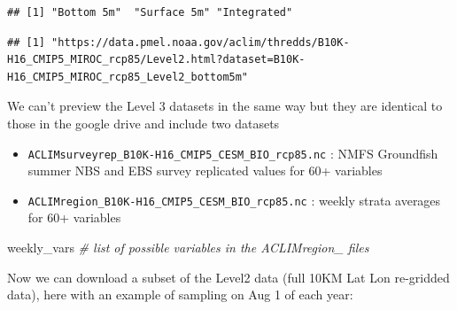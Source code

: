 \documentclass[
]{article}
\newenvironment{Shaded}{\begin{snugshade}}{\end{snugshade}}
\newcommand{\CommentTok}[1]{\textcolor[rgb]{0.56,0.35,0.01}{\textit{#1}}}
\newcommand{\NormalTok}[1]{#1}
\newcommand{\OtherTok}[1]{\textcolor[rgb]{0.56,0.35,0.01}{#1}}
\newcommand{\SpecialCharTok}[1]{\textcolor[rgb]{0.00,0.00,0.00}{#1}}
\newcommand{\StringTok}[1]{\textcolor[rgb]{0.31,0.60,0.02}{#1}}
\providecommand{\tightlist}{%
  \setlength{\itemsep}{0pt}\setlength{\parskip}{0pt}}
\begin{document}
\begin{verbatim}
## [1] "Bottom 5m"  "Surface 5m" "Integrated"
\end{verbatim}

\begin{Shaded}
\end{Shaded}

\begin{verbatim}
## [1] "https://data.pmel.noaa.gov/aclim/thredds/B10K-H16_CMIP5_MIROC_rcp85/Level2.html?dataset=B10K-H16_CMIP5_MIROC_rcp85_Level2_bottom5m"
\end{verbatim}

We can't preview the Level 3 datasets in the same way but they are
identical to those in the google drive and include two datasets

\begin{itemize}
\tightlist
\item
  \texttt{ACLIMsurveyrep\_B10K-H16\_CMIP5\_CESM\_BIO\_rcp85.nc} : NMFS
  Groundfish summer NBS and EBS survey replicated values for 60+
  variables
\item
  \texttt{ACLIMregion\_B10K-H16\_CMIP5\_CESM\_BIO\_rcp85.nc} : weekly
  strata averages for 60+ variables
\end{itemize}

\begin{Shaded}
\begin{Highlighting}[]
\NormalTok{    weekly\_vars  }\CommentTok{\# list of possible variables in the ACLIMregion\_ files }
\end{Highlighting}
\end{Shaded}

Now we can download a subset of the Level2 data (full 10KM Lat Lon
re-gridded data), here with an example of sampling on Aug 1 of each
year:
\end{document}
